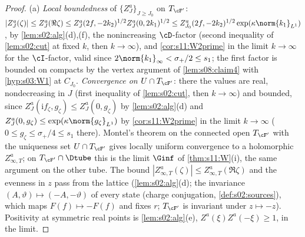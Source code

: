 \begin{proof}
(a) \emph{Local boundedness} of $\{Z^a_J\}_{J\ge J_0}$ on $T_{\cF'}$: $|Z^a_J(\zeta)|\le Z^a_J(\Re\zeta)\le Z^a_J(2f,-2k_2)^{1/2}Z^a_J(0,2k_1)^{1/2}\le Z^a_{J_0}(2f,-2k_2)^{1/2}\exp(\kappa\norm{k_1}_{L^1})$, by \cref{lem:s02:alg}(d),(f), the nonincreasing $\cD$-factor (second inequality of \cref{lem:s02:cut} at fixed $k$, then $k\to\infty$), and \cref{cor:s11:W2prime} in the limit $k\to\infty$ for the $\cI$-factor, valid since $2\norm{k_1}_\infty<\sigma_+/2\le s_1$; the first factor is bounded on compacts by the vertex argument of \cref{lem:s08:claim4} with \cref{hyp:s03:W1} at $C_{J_0}$. \emph{Convergence on $U\cap T_{\cF'}$}: there the values are real, nondecreasing in $J$ (first inequality of \cref{lem:s02:cut}, then $k\to\infty$) and bounded, since $Z^a_J(\mathrm if_\zeta,g_\zeta)\le Z^a_J(0,g_\zeta)$ by \cref{lem:s02:alg}(d) and $Z^a_J(0,g_\zeta)\le\exp(\kappa\norm{g_\zeta}_{L^1})$ by \cref{cor:s11:W2prime} in the limit $k\to\infty$ ($0\le g_\zeta\le\sigma_+/4\le s_1$ there). Montel's theorem on the connected open $T_{\cF'}$ with the uniqueness set $U\cap T_{\cF'}$ gives locally uniform convergence to a holomorphic $Z^a_{\infty,T}$; on $T_{\cF'}\cap\Dtube$ this is the limit $\Ginf$ of \cref{thm:s11:W}(i), the same argument on the other tube. The bound $|Z^a_{\infty,T}(\zeta)|\le Z^a_{\infty,T}(\Re\zeta)$ and the evenness in $z$ pass from the lattice (\cref{lem:s02:alg}(d); the invariance $(A,\vartheta)\mapsto(-A,-\vartheta)$ of every state (charge conjugation, \cref{def:s02:sources}), which maps $F(f)\mapsto-F(f)$ and fixes $r$; $T_{\cF'}$ is invariant under $z\mapsto-z$). Positivity at symmetric real points is \cref{lem:s02:alg}(e), $Z^a(\xi)Z^a(-\xi)\ge1$, in the limit.


\end{proof}
